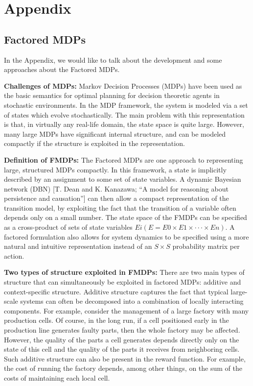 \documentclass[11pt]{article}
\begin{document}
\newpage
\section{Appendix}

\subsection{Factored MDPs}

In the Appendix, we would like to talk about the development and some approaches about the Factored MDPs.

\textbf{Challenges of MDPs: }
%
Markov Decision Processes (MDPs) have been used as the basic semantics for optimal planning for decision theoretic agents in stochastic environments. In the MDP framework, the system is modeled via a set of states which evolve stochastically. The main problem with this representation is that, in virtually any real-life domain, the state space is quite large. However, many large MDPs have significant internal structure, and can be modeled compactly if the structure is exploited in the representation.


\textbf{Definition of FMDPs: }
The Factored MDPs are one approach to representing large, structured MDPs compactly. In this framework, a state is implicitly described by an assignment to some set of state variables. A dynamic Bayesian network (DBN) [T. Dean and K. Kanazawa; “A model for reasoning about persistence and causation”] can then allow a compact representation of the transition model, by exploiting the fact that the transition of a variable often depends only on a small number. The state space of the FMDPs can be specified as a cross-product of sets of state variables
$Ei (E = E0 × E1 × ··· × En)$. A factored formulation also allows for system dynamics to be specified using a more natural and intuitive representation instead of an $S×S$ probability matrix per action.

\textbf{Two types of structure exploited in FMDPs: }
There are two main types of structure that can simultaneously be exploited in factored MDPs: additive and context-specific structure. Additive structure captures the fact that typical large-scale systems can often be decomposed into a combination of locally interacting components. For example, consider the management of a large factory with many production cells. Of course, in the long run, if a cell positioned early in the production line generates faulty parts, then the whole factory may be affected. However, the quality of the parts a cell generates depends directly only on the state of this cell and the quality of the parts it receives from neighboring cells. Such additive structure can also be present in the reward function. For example, the cost of running the factory depends, among other things, on the sum of the costs of maintaining each local cell.
\end{document}
